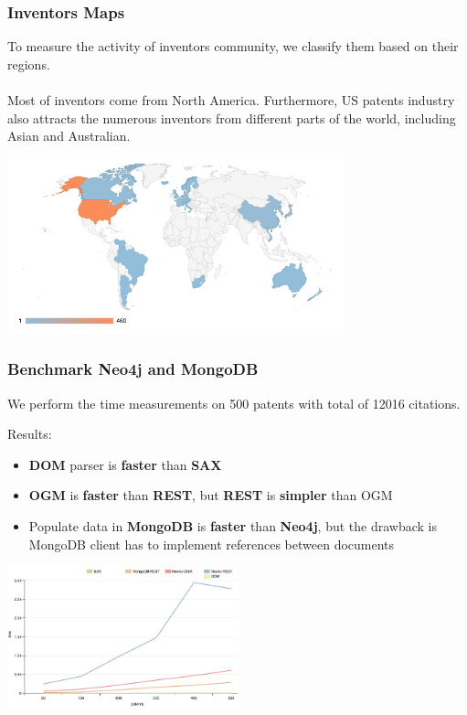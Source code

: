 \documentclass{beamer}
\begin{document}
\begin{frame}
\frametitle{Inventors Maps}
To measure the activity of inventors community, we classify them based on their regions.\\~\\
Most of inventors come from North America. Furthermore, US patents industry also attracts the numerous inventors from different parts of the world, including Asian and Australian.
\begin{center}
\includegraphics[height=2in]{inventor-map.png}
\end{center}
\end{frame}

\begin{frame}
\frametitle{Benchmark Neo4j and MongoDB}
We perform the time measurements on 500 patents with total of 12016 citations.\\
\begin{multicols}{2}
Results:
\begin{itemize}
\item \textbf{DOM} parser is \textbf{faster} than \textbf{SAX}
\item \textbf{OGM} is \textbf{faster} than \textbf{REST}, but \textbf{REST} is \textbf{simpler} than OGM
\item Populate data in \textbf{MongoDB} is \textbf{faster} than \textbf{Neo4j}, but the drawback is MongoDB client has to implement references between documents
\end{itemize}
\columnbreak
\begin{center}
\includegraphics[width=0.5\textwidth]{line.png}
\end{center}
\end{multicols}
\end{frame}
\end{document}
